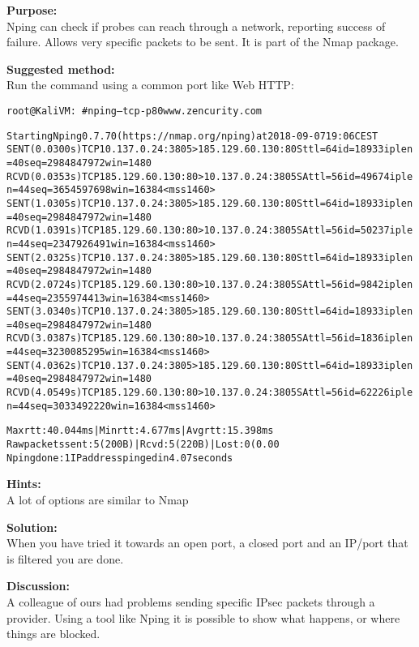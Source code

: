 \documentclass[a4paper,11pt,notitlepage]{report}
\begin{document}
{\bf Purpose:}\\
Nping can check if probes can reach through a network, reporting success of failure. Allows very specific packets to be sent. It is part of the Nmap package.

{\bf Suggested method:}\\
Run the command using a common port like Web HTTP:
\begin{alltt}\footnotesize
root@KaliVM:~# nping --tcp -p 80 www.zencurity.com

Starting Nping 0.7.70 ( https://nmap.org/nping ) at 2018-09-07 19:06 CEST
SENT (0.0300s) TCP 10.137.0.24:3805 > 185.129.60.130:80 S ttl=64 id=18933 iplen=40  seq=2984847972 win=1480
RCVD (0.0353s) TCP 185.129.60.130:80 > 10.137.0.24:3805 SA ttl=56 id=49674 iplen=44  seq=3654597698 win=16384 <mss 1460>
SENT (1.0305s) TCP 10.137.0.24:3805 > 185.129.60.130:80 S ttl=64 id=18933 iplen=40  seq=2984847972 win=1480
RCVD (1.0391s) TCP 185.129.60.130:80 > 10.137.0.24:3805 SA ttl=56 id=50237 iplen=44  seq=2347926491 win=16384 <mss 1460>
SENT (2.0325s) TCP 10.137.0.24:3805 > 185.129.60.130:80 S ttl=64 id=18933 iplen=40  seq=2984847972 win=1480
RCVD (2.0724s) TCP 185.129.60.130:80 > 10.137.0.24:3805 SA ttl=56 id=9842 iplen=44  seq=2355974413 win=16384 <mss 1460>
SENT (3.0340s) TCP 10.137.0.24:3805 > 185.129.60.130:80 S ttl=64 id=18933 iplen=40  seq=2984847972 win=1480
RCVD (3.0387s) TCP 185.129.60.130:80 > 10.137.0.24:3805 SA ttl=56 id=1836 iplen=44  seq=3230085295 win=16384 <mss 1460>
SENT (4.0362s) TCP 10.137.0.24:3805 > 185.129.60.130:80 S ttl=64 id=18933 iplen=40  seq=2984847972 win=1480
RCVD (4.0549s) TCP 185.129.60.130:80 > 10.137.0.24:3805 SA ttl=56 id=62226 iplen=44  seq=3033492220 win=16384 <mss 1460>

Max rtt: 40.044ms | Min rtt: 4.677ms | Avg rtt: 15.398ms
Raw packets sent: 5 (200B) | Rcvd: 5 (220B) | Lost: 0 (0.00%)
Nping done: 1 IP address pinged in 4.07 seconds
\end{alltt}

{\bf Hints:} \\
A lot of options are similar to Nmap

{\bf Solution:}\\
When you have tried it towards an open port, a closed port and an IP/port that is filtered you are done.

{\bf Discussion:}\\
A colleague of ours had problems sending specific IPsec packets through a provider. Using a tool like Nping it is possible to show what happens, or where things are blocked.
\end{document}
